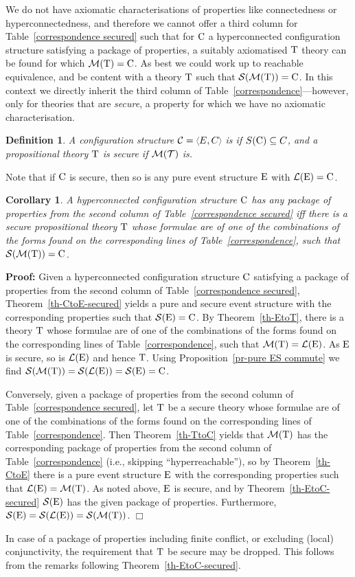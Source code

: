 \documentclass[twocolumn]{article}
\newtheorem{defi}{Definition}[section]
\newtheorem{coro}{Corollary}
\newenvironment{definition}[1]{\begin{defi} \rm \label{df-#1} }{\end{defi}}
\newenvironment{corollary}[1]{\begin{coro} \rm \label{cor-#1} }{\end{coro}}
\newenvironment{proof}{\begin{trivlist} \item[\hspace{\labelsep}\bf
Proof:]}{\hfill $\Box$\end{trivlist}}
\newcommand{\thm}[1]{Theorem~\ref{th-#1}}
\newcommand{\pr}[1]{Proposition~\ref{pr-#1}}
\newcommand{\phrase}[1]{\index{#1}{\em #1}}		\newcommand{\implies}{\Rightarrow}
\begin{document}
We do not have axiomatic characterisations of properties like
connectedness or hyperconnectedness, and therefore we cannot offer a
third column for Table~\ref{correspondence secured} such that for
${\rm C}$ a hyperconnected configuration structure satisfying a package of
properties, a suitably axiomatised ${\rm T}$ theory can be found for which
${\cal M}({\rm T})={\rm C}$. 
As best we could work up to reachable equivalence, and be content with
a theory ${\rm T}$ such that ${\cal S}({\cal M}({\rm T})) = {\rm C}$.
In this context we directly inherit the third column of
Table~\ref{correspondence}---however, only for theories that are
\emph{secure}, a property for which we have no axiomatic characterisation.
\begin{definition}{secure-PT}
A configuration structure $\fC=\tuple{E,C}$ is \phrase{secure} if
$S({\rm C})\subseteq C$, and a propositional theory ${\rm T}$ is \emph{secure}
if ${\cal M}({\cal T})$ is.
\end{definition}
Note that if ${\rm C}$ is secure, then so is any pure event structure
${\rm E}$ with ${\cal L}({\rm E})={\rm C}$.

\begin{corollary}{CtoT-secured}
A hyperconnected configuration structure ${\rm C}$ has any package of
properties from the second column of Table~\ref{correspondence secured} iff
there is a secure propositional theory ${\rm T}$ whose formulae are of
one of the combinations of the forms found on the corresponding lines
of Table~\ref{correspondence}, such that ${\cal S}({\cal M}({\rm T})) = {\rm C}$.
\end{corollary}

\begin{proof}
Given a hyperconnected configuration structure ${\rm C}$ satisfying a
package of properties from the second column of
Table~\ref{correspondence secured}, \thm{CtoE-secured} yields a pure
and secure event structure with the corresponding properties such that
${\cal S}({\rm E})={\rm C}$. By \thm{EtoT}, there is a theory ${\rm T}$ whose formulae are of
one of the combinations of the forms found on the corresponding lines
of Table~\ref{correspondence}, such that ${\cal M}({\rm T}) = {\cal L}({\rm E})$.
As ${\rm E}$ is secure, so is ${\cal L}({\rm E})$ and hence ${\rm T}$.
Using \pr{pure ES commute} we find ${\cal S}({\cal M}({\rm T})) = {\cal S}({\cal L}({\rm E}))
={\cal S}({\rm E})= {\rm C}$.

Conversely, given a package of properties from the second column of
Table~\ref{correspondence secured}, let ${\rm T}$ be a secure theory whose
formulae are of one of the combinations of the forms found on the
corresponding lines of Table~\ref{correspondence}.
Then \thm{TtoC} yields that ${\cal M}({\rm T})$ has the corresponding package of
properties from  the second column of Table~\ref{correspondence}
(i.e., skipping ``hyperreachable''), so by \thm{CtoE} there is a pure
event structure ${\rm E}$ with the corresponding properties such that
${\cal L}({\rm E})={\cal M}({\rm T})$. As noted above, ${\rm E}$ is secure, and by
\thm{EtoC-secured} ${\cal S}({\rm E})$ has the given package of properties. Furthermore,
${\cal S}({\rm E})={\cal S}({\cal L}({\rm E}))= {\cal S}({\cal M}({\rm T}))$.
\end{proof}
In case of a package of properties including finite conflict, or
excluding (local) conjunctivity, the requirement that ${\rm T}$ be secure
may be dropped. This follows from the remarks following \thm{EtoC-secured}.
\end{document}
